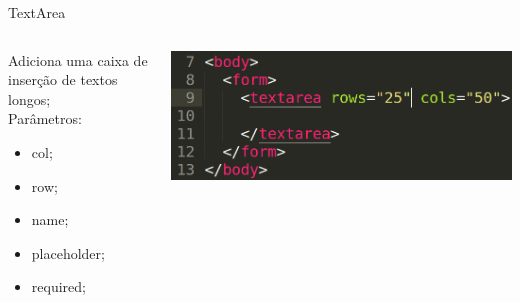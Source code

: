 \documentclass{beamer}
\begin{document}
\begin{frame}{TextArea}
    \begin{columns}
    \begin{column}{0.4 \textwidth}
      \small
      Adiciona uma caixa de inserção de textos longos;\\
      Parâmetros:
     \begin{itemize}
       \item col;
        \item row;
        \item name;
        \item placeholder;
        \item required;
     \end{itemize}
    \end{column}
    
    \begin{column}{0.5\textwidth}
     \includegraphics[height=0.25\paperheight]{fig/aula4/aula4_8.png}
    \end{column}
  \end{columns}
\end{frame}
\end{document}
